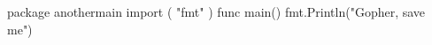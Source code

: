 \documentclass[10pt]{article}
\begin{document}
\begin{minipage}[t]{.25\textwidth}
    \begin{codebox}
        \begin{gocode}
            package anothermain
            import (
            "fmt"
            )
            func main() {
                fmt.Println("Gopher, save me")
            }
        \end{gocode}
    \end{codebox}
\end{minipage}%
\end{document}
